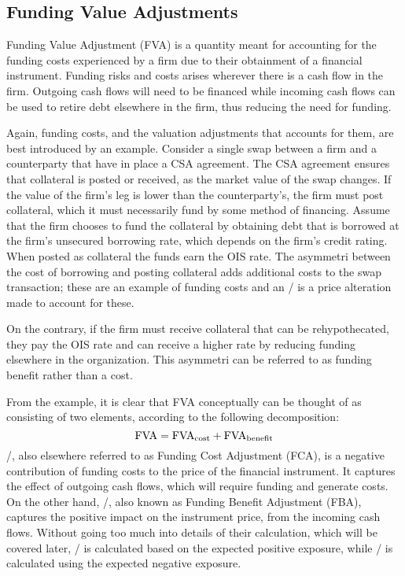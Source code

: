 \documentclass[main.tex]{subfiles}
\begin{document}
    \subsection{Funding Value Adjustments}
        Funding Value Adjustment (FVA) is a quantity meant for accounting for the funding costs 
        experienced by a firm due to their obtainment of a financial instrument.
        Funding risks and costs arises wherever there is a cash flow in the firm. 
        Outgoing cash flows will need to be financed while incoming cash flows
        can be used to retire debt elsewhere in the firm, thus reducing the need for funding.

        Again, funding costs, and the valuation adjustments that accounts for them,
        are best introduced by an example.
        Consider a single swap between a firm and a counterparty that have in place a CSA agreement.
        The CSA agreement ensures that collateral is posted or received,
        as the market value of the swap changes.
        If the value of the firm's leg is lower than the counterparty's,
        the firm must post collateral, which it must necessarily fund by some method of financing.
        Assume that the firm chooses to fund the collateral by obtaining debt
        that is borrowed at the firm's unsecured borrowing rate, which depends on the firm's credit rating.
        When posted as collateral the funds earn the OIS rate.
        The asymmetri between the cost of borrowing and posting collateral
        adds additional costs to the swap transaction; 
        these are an example of funding costs and an \FVA/ is a price alteration made to account for these.

        On the contrary, if the firm must receive collateral that can be rehypothecated,
        they pay the OIS rate and can receive a higher rate
        by reducing funding elsewhere in the organization.
        This asymmetri can be referred to as funding benefit rather than a cost.
        
        From the example, it is clear that FVA conceptually can be thought of 
        as consisting of two elements, according to the following decomposition:
        \begin{equation}
            \FVA/ = \FCA/ + \FBA/
        \end{equation}
        \FCA/, also elsewhere referred to as Funding Cost Adjustment (FCA), 
        is a negative contribution of funding costs to the price of the financial instrument.
        It captures the effect of outgoing cash flows, which will require funding and generate costs.
        On the other hand, \FBA/, also known as Funding Benefit Adjustment (FBA), 
        captures the positive impact on the instrument price, from the incoming cash flows.
        Without going too much into details of their calculation, which will be covered later,
        \FCA/ is calculated based on the expected positive exposure, 
        while \FBA/ is calculated using the expected negative exposure. 
\end{document}
